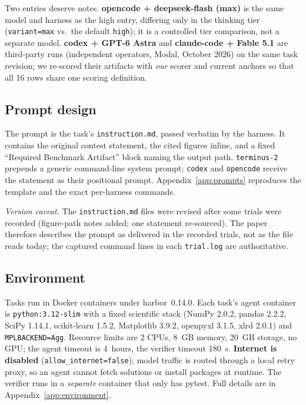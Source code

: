 Two entries deserve notes. \textbf{opencode + deepseek-flash (max)} is the same model and harness as the high entry, differing only in the thinking tier (\texttt{variant=max} vs.\ the default \texttt{high}); it is a controlled tier comparison, not a separate model. \textbf{codex + GPT-6 Astra} and \textbf{claude-code + Fable 5.1} are third-party runs (independent operators, Modal, October 2026) on the same task revision; we re-scored their artifacts with \emph{our} scorer and current anchors so that all 16 rows share one scoring definition.

\subsection{Prompt design}
The prompt is the task's \texttt{instruction.md}, passed verbatim by the harness. It contains the original contest statement, the cited figures inline, and a fixed ``Required Benchmark Artifact'' block naming the output path. \texttt{terminus-2} prepends a generic command-line system prompt; \texttt{codex} and \texttt{opencode} receive the statement as their positional prompt. Appendix~\ref{app:prompts} reproduces the template and the exact per-harness commands.

\emph{Version caveat.} The \texttt{instruction.md} files were revised after some trials were recorded (figure-path notes added; one statement re-sourced). The paper therefore describes the prompt as delivered in the recorded trials, not as the file reads today; the captured command lines in each \texttt{trial.log} are authoritative.

\subsection{Environment}
Tasks run in Docker containers under harbor~0.14.0. Each task's agent container is \texttt{python:3.12-slim} with a fixed scientific stack (NumPy 2.0.2, pandas 2.2.2, SciPy 1.14.1, scikit-learn 1.5.2, Matplotlib 3.9.2, openpyxl 3.1.5, xlrd 2.0.1) and \texttt{MPLBACKEND=Agg}. Resource limits are 2 CPUs, 8~GB memory, 20~GB storage, no GPU; the agent timeout is 4~hours, the verifier timeout 180~s. \textbf{Internet is disabled} (\texttt{allow\_internet=false}); model traffic is routed through a local retry proxy, so an agent cannot fetch solutions or install packages at runtime. The verifier runs in a \emph{separate} container that only has pytest. Full details are in Appendix~\ref{app:environment}.

